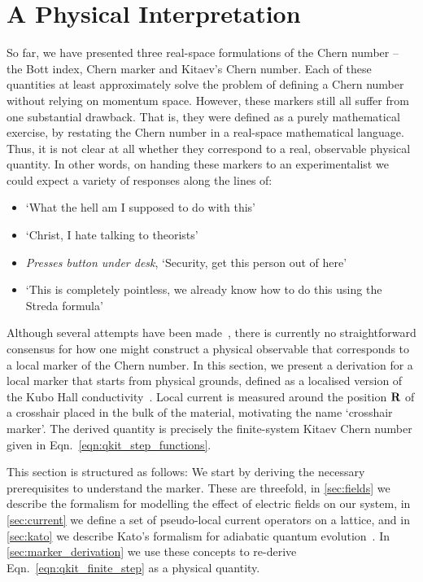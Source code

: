 \section{A Physical Interpretation}
\label{sec:physical_interpretation_kitaev_marker}

So far, we have presented three real-space formulations of the Chern number -- the Bott index, Chern marker and Kitaev's Chern number. Each of these quantities at least approximately solve the problem of defining a Chern number without relying on momentum space. However, these markers still all suffer from one substantial drawback. That is, they were defined as a purely mathematical exercise, by restating the Chern number in a real-space mathematical language. Thus, it is not clear at all whether they correspond to a real, observable physical quantity. In other words, on handing these markers to an experimentalist we could expect a variety of responses along the lines of:
\begin{itemize}
    \item `What the hell am I supposed to do with this'
    \item `Christ, I hate talking to theorists'
    \item \textit{Presses button under desk}, `Security, get this person out of here'
    \item `This is completely pointless, we already know how to do this using the Streda formula'~\cite{yazdani_notitle_2022, streda_theory_1982}
\end{itemize}
Although several attempts have been made~\cite{bianco_orbital_2013, mitchell_amorphous_2018, rauch_geometric_2018}, there is currently no straightforward consensus for how one might construct a physical observable that corresponds to a local marker of the Chern number. In this section, we present a derivation for a local marker that starts from physical grounds, defined as a localised version of the Kubo Hall conductivity~\cite{kubo_statistical-mechanical_1957}. Local current is measured around the position $\textbf R$ of a crosshair placed in the bulk of the material, motivating the name `crosshair marker'. The derived quantity is precisely the finite-system Kitaev Chern number given in Eqn.~\ref{eqn:qkit_step_functions}. 
 
This section is structured as follows: We start by deriving the necessary prerequisites to understand the marker. These are threefold, in \textsection\ref{sec:fields} we describe the formalism for modelling the effect of electric fields on our system, in \textsection\ref{sec:current} we define a set of pseudo-local current operators on a lattice, and in \textsection\ref{sec:kato} we describe Kato's formalism for adiabatic quantum evolution~\cite{kato_adiabatic_1950,simon_tosio_2018}. In \textsection\ref{sec:marker_derivation} we use these concepts to re-derive Eqn.~\ref{eqn:qkit_finite_step} as a physical quantity.

